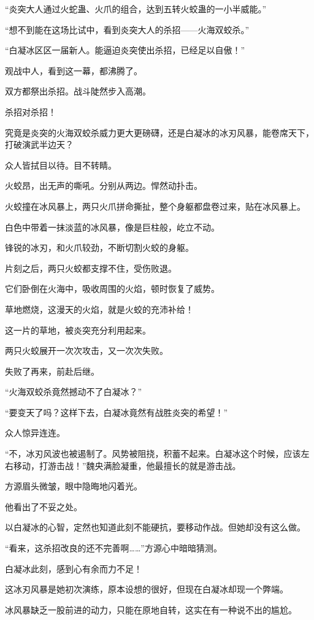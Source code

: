 \begin{this_body}
“炎突大人通过火蛇蛊、火爪的组合，达到五转火蛟蛊的一小半威能。”

“想不到能在这场比试中，看到炎突大人的杀招——火海双蛟杀。”

“白凝冰区区一届新人。能逼迫炎突使出杀招，已经足以自傲！”

观战中人，看到这一幕，都沸腾了。

双方都祭出杀招。战斗陡然步入高潮。

杀招对杀招！

究竟是炎突的火海双蛟杀威力更大更磅礴，还是白凝冰的冰刃风暴，能卷席天下，打破演武半边天？

众人皆拭目以待。目不转睛。

火蛟昂，出无声的嘶吼。分别从两边。悍然动扑击。

火蛟撞在冰风暴上，两只火爪拼命撕扯，整个身躯都盘卷过来，贴在冰风暴上。

白色中带着一抹淡蓝的冰风暴，像是巨柱般，屹立不动。

锋锐的冰刃，和火爪较劲，不断切割火蛟的身躯。

片刻之后，两只火蛟都支撑不住，受伤败退。

它们卧倒在火海中，吸收周围的火焰，顿时恢复了威势。

草地燃烧，这漫天的火焰，就是火蛟的充沛补给！

这一片的草地，被炎突充分利用起来。

两只火蛟展开一次次攻击，又一次次失败。

失败了再来，前赴后继。

“火海双蛟杀竟然撼动不了白凝冰？”

“要变天了吗？这样下去，白凝冰竟然有战胜炎突的希望！”

众人惊异连连。

“不，冰刃风波也被遏制了。风势被阻挠，积蓄不起来。白凝冰这个时候，应该左右移动，打游击战！”魏央满脸凝重，他最擅长的就是游击战。

方源眉头微皱，眼中隐晦地闪着光。

他看出了不妥之处。

以白凝冰的心智，定然也知道此刻不能硬抗，要移动作战。但她却没有这么做。

“看来，这杀招改良的还不完善啊……”方源心中暗暗猜测。

白凝冰此刻，感到心有余而力不足！

这冰刃风暴是她初次演练，原本设想的很好，但现在白凝冰却现一个弊端。

冰风暴缺乏一股前进的动力，只能在原地自转，这实在有一种说不出的尴尬。


\end{this_body}
